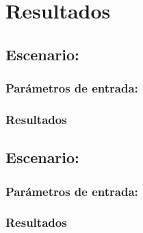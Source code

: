 
\chapter{Resultados} %

\label{Chapter7} %



\section{Escenario: } 
\subsection{Parámetros de entrada: }
\subsection{Resultados}


\section{Escenario: }
\subsection{Parámetros de entrada: }
\subsection{Resultados}

